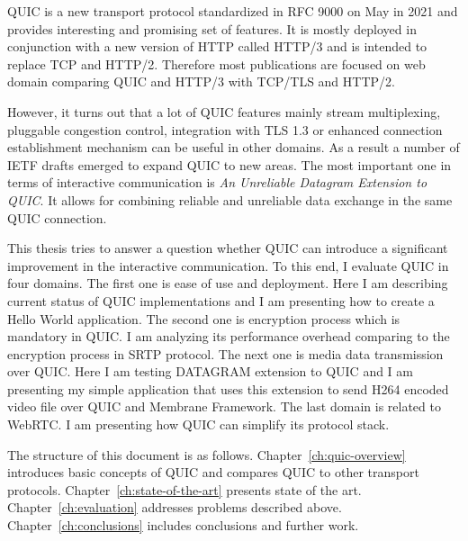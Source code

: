 QUIC is a new transport protocol standardized in RFC 9000 on May in 2021 and provides interesting and promising set of features.
%
It is mostly deployed in conjunction with a new version of HTTP called HTTP/3 and is intended to replace TCP and HTTP/2.
Therefore most publications are focused on web domain comparing QUIC and HTTP/3 with TCP/TLS and HTTP/2.

However, it turns out that a lot of QUIC features mainly stream multiplexing, pluggable congestion control, integration with TLS 1.3
or enhanced connection establishment mechanism can be useful in other domains.
As a result a number of IETF drafts emerged to expand QUIC to new areas.
The most important one in terms of interactive communication is \textit{An Unreliable Datagram Extension to QUIC}.
It allows for combining reliable and unreliable data exchange in the same QUIC connection.

This thesis tries to answer a question whether QUIC can introduce a significant improvement in the interactive communication.
To this end, I evaluate QUIC in four domains.
The first one is ease of use and deployment.
Here I am describing current status of QUIC implementations and I am presenting how to create a Hello World application.
The second one is encryption process which is mandatory in QUIC\@.
I am analyzing its performance overhead comparing to the encryption process in SRTP protocol.
The next one is media data transmission over QUIC\@.
Here I am testing DATAGRAM extension to QUIC and I am presenting my simple application that uses this extension to send H264 encoded video file over QUIC and Membrane Framework.
The last domain is related to WebRTC\@.
I am presenting how QUIC can simplify its protocol stack.

The structure of this document is as follows.
Chapter~\ref{ch:quic-overview} introduces basic concepts of QUIC and compares QUIC to other transport protocols.
Chapter~\ref{ch:state-of-the-art} presents state of the art.
Chapter~\ref{ch:evaluation} addresses problems described above.
Chapter~\ref{ch:conclusions} includes conclusions and further work.


